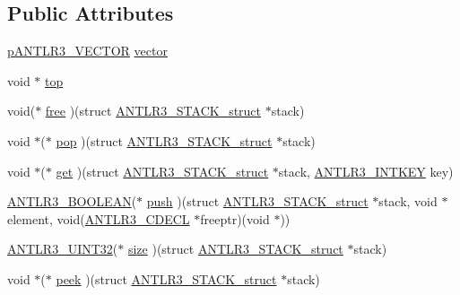\subsection*{Public Attributes}
\begin{DoxyCompactItemize}
\item 
\hyperlink{antlr3interfaces_8h_a0dfeeada7529fbe1b968be84079b828f}{p\-A\-N\-T\-L\-R3\-\_\-\-V\-E\-C\-T\-O\-R} \hyperlink{struct_a_n_t_l_r3___s_t_a_c_k__struct_afc4ca6a2df0cf655ead002acc60936d1}{vector}
\item 
void $\ast$ \hyperlink{struct_a_n_t_l_r3___s_t_a_c_k__struct_abffbd077b5ad2c498fc0aeca3036c5a2}{top}
\item 
void($\ast$ \hyperlink{struct_a_n_t_l_r3___s_t_a_c_k__struct_a7a3b9cc26d605b38e1e8c3fa81f52a25}{free} )(struct \hyperlink{struct_a_n_t_l_r3___s_t_a_c_k__struct}{A\-N\-T\-L\-R3\-\_\-\-S\-T\-A\-C\-K\-\_\-struct} $\ast$stack)
\item 
void $\ast$($\ast$ \hyperlink{struct_a_n_t_l_r3___s_t_a_c_k__struct_af6f34d7b0370a403361cffd66639e58b}{pop} )(struct \hyperlink{struct_a_n_t_l_r3___s_t_a_c_k__struct}{A\-N\-T\-L\-R3\-\_\-\-S\-T\-A\-C\-K\-\_\-struct} $\ast$stack)
\item 
void $\ast$($\ast$ \hyperlink{struct_a_n_t_l_r3___s_t_a_c_k__struct_a78896dc210e11aa79ba8edee9349ab6f}{get} )(struct \hyperlink{struct_a_n_t_l_r3___s_t_a_c_k__struct}{A\-N\-T\-L\-R3\-\_\-\-S\-T\-A\-C\-K\-\_\-struct} $\ast$stack, \hyperlink{antlr3defs_8h_aa5533fd558adc28dc2af0039f52324a8}{A\-N\-T\-L\-R3\-\_\-\-I\-N\-T\-K\-E\-Y} key)
\item 
\hyperlink{antlr3defs_8h_a5b33dccbba3b7212539695e21df4079b}{A\-N\-T\-L\-R3\-\_\-\-B\-O\-O\-L\-E\-A\-N}($\ast$ \hyperlink{struct_a_n_t_l_r3___s_t_a_c_k__struct_af4d50fc3d9f2b68eb22585d989777fb7}{push} )(struct \hyperlink{struct_a_n_t_l_r3___s_t_a_c_k__struct}{A\-N\-T\-L\-R3\-\_\-\-S\-T\-A\-C\-K\-\_\-struct} $\ast$stack, void $\ast$element, void(\hyperlink{antlr3defs_8h_a91c919dd260a95cc88a0cd9b5c0a11cc}{A\-N\-T\-L\-R3\-\_\-\-C\-D\-E\-C\-L} $\ast$freeptr)(void $\ast$))
\item 
\hyperlink{antlr3defs_8h_ac41f744abd0fd25144b9eb9d11b1dfd1}{A\-N\-T\-L\-R3\-\_\-\-U\-I\-N\-T32}($\ast$ \hyperlink{struct_a_n_t_l_r3___s_t_a_c_k__struct_a19154ad0a9501404724b051b430f16a6}{size} )(struct \hyperlink{struct_a_n_t_l_r3___s_t_a_c_k__struct}{A\-N\-T\-L\-R3\-\_\-\-S\-T\-A\-C\-K\-\_\-struct} $\ast$stack)
\item 
void $\ast$($\ast$ \hyperlink{struct_a_n_t_l_r3___s_t_a_c_k__struct_a333185358f1536e962df8e3021e87143}{peek} )(struct \hyperlink{struct_a_n_t_l_r3___s_t_a_c_k__struct}{A\-N\-T\-L\-R3\-\_\-\-S\-T\-A\-C\-K\-\_\-struct} $\ast$stack)
\end{DoxyCompactItemize}


